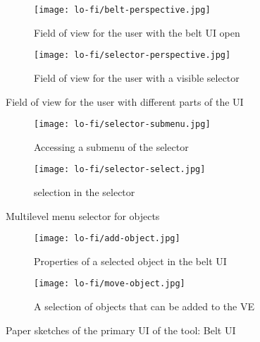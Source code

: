 
\begin{figure}
  \begin{subfigure}{.5\textwidth}
  \centering
  \texttt{[image: lo-fi/belt-perspective.jpg]}
  \caption{Field of view for the user with the belt UI open}
  \label{fig:lofi:fov:belt-ui}
  \end{subfigure}%
  \begin{subfigure}{.5\textwidth}
    \centering
    \texttt{[image: lo-fi/selector-perspective.jpg]}
    \caption{Field of view for the user with a visible selector}
    \label{fig:lofi:fov:selector}
\end{subfigure}
\caption{Field of view for the user with different parts of the UI}
\label{fig:lofi:fov}
\end{figure}


\begin{figure}
\begin{subfigure}{.5\textwidth}
  \centering
  \texttt{[image: lo-fi/selector-submenu.jpg]}
  \caption{Accessing a submenu of the selector}
  \label{fig:lofi:selector:select}
\end{subfigure}%
\begin{subfigure}{.5\textwidth}
  \centering
  \texttt{[image: lo-fi/selector-select.jpg]}
  \caption{selection in the selector}
  \label{fig:lofi:selector:submenu}
\end{subfigure}
\caption{Multilevel menu selector for objects}
\label{fig:lofi:selector}
\end{figure}


\begin{figure}
\begin{subfigure}{.5\textwidth}
  \centering
  \texttt{[image: lo-fi/add-object.jpg]}
  \caption{Properties of a selected object in the belt UI}
  \label{fig:lofi:object:add}
\end{subfigure}%
\begin{subfigure}{.5\textwidth}
  \centering
  \texttt{[image: lo-fi/move-object.jpg]}
  \caption{A selection of objects that can be added to the VE}
  \label{fig:lofi:object:move}
\end{subfigure}
\caption{Paper sketches of the primary UI of the tool: Belt UI}
\label{fig:lofi:object}
\end{figure}

